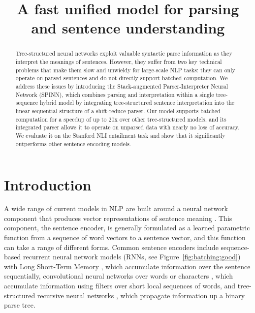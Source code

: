 \documentclass[11pt]{article}
\title{A fast unified model for parsing and sentence understanding}
\author{}
\date{}
\begin{document}
\maketitle
\begin{abstract}

Tree-structured neural networks exploit valuable syntactic parse information as they interpret the meanings of sentences. However, they suffer from two key technical problems that make them slow and unwieldy for large-scale NLP tasks: they can only operate on parsed sentences and do not directly support batched computation. We address these issues by introducing the Stack-augmented Parser-Interpreter Neural Network (SPINN), which combines parsing and interpretation within a single tree-sequence hybrid model by integrating tree-structured sentence interpretation into the linear sequential structure of a shift-reduce parser. Our model supports batched computation for a speedup of up to 20x over other tree-structured models, and its integrated parser allows it to operate on unparsed data with nearly no loss of accuracy. We evaluate it on the Stanford NLI entailment task and show that it significantly outperforms other sentence encoding models.
\end{abstract}

\section{Introduction}




A wide range of current models in NLP are built around a neural network component that produces vector representations of sentence meaning \citep{tai2015improved,sutskever2014sequence}. This component, the sentence encoder, is generally formulated as a learned parametric function from a sequence of word vectors to a sentence vector, and this function can take a range of different forms. Common sentence encoders include sequence-based recurrent neural network models (RNNs, see Figure~\ref{fig:batching:good}) with Long Short-Term Memory \citep[LSTM,][]{hochreiter1997long}, which accumulate information over the sentence sequentially, convolutional neural networks over words or characters \citep{kalchbrenner2014convolutional,DBLP:journals/corr/ZhangZL15}, which accumulate information using filters over short local sequences of words, and tree-structured recursive neural networks \citep[TreeRNNs,][see Figure~\ref{fig:batching:bad}]{goller1996learning,socher2011parsing}, which propagate information up a binary parse tree.
\end{document}
